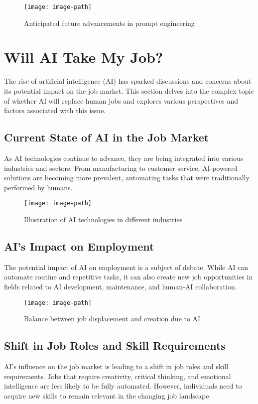 \begin{figure}[hbt!]
 \centering
 \texttt{[image: image-path]}
 \caption{Anticipated future advancements in prompt engineering}
 \label{fig:future-directions}
\end{figure}
\FloatBarrier

\section{Will AI Take My Job?}
The rise of artificial intelligence (AI) has sparked discussions and concerns about its potential impact on the job market. This section delves into the complex topic of whether AI will replace human jobs and explores various perspectives and factors associated with this issue.

\subsection{Current State of AI in the Job Market}
As AI technologies continue to advance, they are being integrated into various industries and sectors. From manufacturing to customer service, AI-powered solutions are becoming more prevalent, automating tasks that were traditionally performed by humans.

\begin{figure}[hbt!]
 \centering
 \texttt{[image: image-path]}
 \caption{Illustration of AI technologies in different industries}
 \label{fig:ai-industries}
\end{figure}
\FloatBarrier

\subsection{AI's Impact on Employment}
The potential impact of AI on employment is a subject of debate. While AI can automate routine and repetitive tasks, it can also create new job opportunities in fields related to AI development, maintenance, and human-AI collaboration.

\begin{figure}[hbt!]
 \centering
 \texttt{[image: image-path]}
 \caption{Balance between job displacement and creation due to AI}
 \label{fig:job-impact}
\end{figure}
\FloatBarrier

\subsection{Shift in Job Roles and Skill Requirements}
AI's influence on the job market is leading to a shift in job roles and skill requirements. Jobs that require creativity, critical thinking, and emotional intelligence are less likely to be fully automated. However, individuals need to acquire new skills to remain relevant in the changing job landscape.


